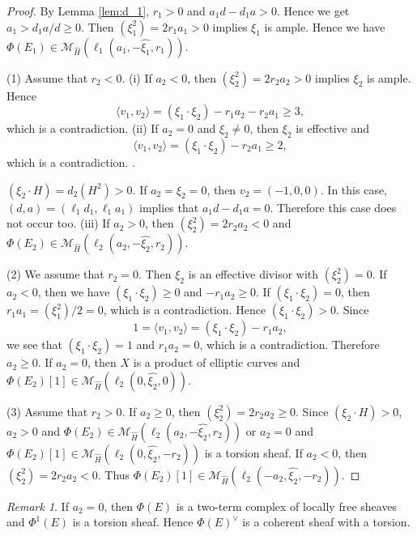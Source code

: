 \documentclass[10pt]{amsart}
\def\cal{\mathcal}
\newenvironment{NB}{
\color{red}{\bf NB}. \footnotesize 
}{}
\numberwithin{equation}{section}
\theoremstyle{plain}
\theoremstyle{definition}
\theoremstyle{remark}
\newtheorem{rem}[thm]{Remark}
\begin{document}
\begin{proof}
By Lemma \ref{lem:d_1}, $r_1>0$ and $a_1 d-d_1 a>0$.
Hence we get $a_1>d_1 a/d \geq 0$.
Then $(\xi_1^2)=2r_1 a_1>0$ implies $\xi_1$ is ample.
Hence we have $\Phi(E_1) \in {\cal M}_{\widehat{H}}(\ell_1(a_1,-\widehat{\xi_1},r_1))$.

(1) Assume that $r_2<0$.
(i) If $a_2<0$, then $(\xi_2^2)=2r_2 a_2>0$ implies $\xi_2$ is ample.
Hence 
$$
\langle v_1,v_2 \rangle=(\xi_1 \cdot \xi_2)-r_1 a_2-r_2 a_1 \geq 3,
$$
which is a contradiction.
(ii) If $a_2=0$ and $\xi_2 \ne 0$, then $\xi_2$ is effective and
$$
\langle v_1,v_2 \rangle=(\xi_1 \cdot \xi_2)-r_2 a_1 \geq 2,
$$
 which is a contradiction.
\begin{NB}
$(\xi_2 \cdot H)=d_2(H^2)>0$.
\end{NB}
If $a_2=\xi_2=0$, then $v_2=(-1,0,0)$.
In this case, $(d,a)=(\ell_1 d_1,\ell_1 a_1)$ implies that
$a_1 d-d_1 a=0$.
Therefore this case does not occur too.
(iii) If $a_2>0$, then $(\xi_2^2)=2r_2 a_2<0$ and
$\Phi(E_2) \in {\cal M}_{\widehat{H}}(\ell_2(a_2,-\widehat{\xi_2},r_2))$.




(2)
We assume that $r_2=0$. Then $\xi_2$ is an effective divisor with $(\xi_2^2)=0$.
If $a_2 < 0$, then 
we have $(\xi_1 \cdot \xi_2) \geq 0$ and $-r_1 a_2 \geq 0$.
If $(\xi_1 \cdot \xi_2)=0$, then $r_1 a_1=(\xi_1^2)/2=0$, which is a contradiction.
Hence $(\xi_1 \cdot \xi_2)>0$.
Since 
$$
1=\langle v_1,v_2 \rangle=(\xi_1 \cdot \xi_2)-r_1 a_2,
$$
we see that
 $(\xi_1 \cdot \xi_2 )=1$ and $r_1 a_2=0$,
which is a contradiction.
Therefore $a_2 \geq 0$.
If $a_2=0$, then 
$X$ is a product of elliptic curves
and $\Phi(E_2)[1] \in {\cal M}_{\widehat{H}}(\ell_2(0,\widehat{\xi_2},0))$.

(3)
Assume that $r_2 > 0$.
If $a_2 \geq 0$, then $(\xi_2^2) =2r_2 a_2 \geq 0$.
Since $(\xi_2 \cdot H)>0$, 
$a_2>0$ and $\Phi(E_2) \in {\cal M}_{\widehat{H}}(\ell_2(a_2,-\widehat{\xi_2},r_2))$ or
$a_2=0$ and
$\Phi(E_2)[1] \in {\cal M}_{\widehat{H}}(\ell_2(0,\widehat{\xi_2},-r_2))$ is a torsion sheaf.
If $a_2<0$, then
$(\xi_2^2)=2r_2 a_2 < 0$.
Thus $\Phi(E_2)[1] \in {\cal M}_{\widehat{H}}(\ell_2(-a_2,\widehat{\xi_2},-r_2))$. 
\end{proof}



 

\begin{rem}
If $a_2=0$, then $\Phi(E)$ is a two-term complex of locally free sheaves and
$\Phi^1(E)$ is a torsion sheaf.
Hence $\Phi(E)^{\vee}$ is a coherent sheaf with a torsion.
 \end{rem}
\end{document}
